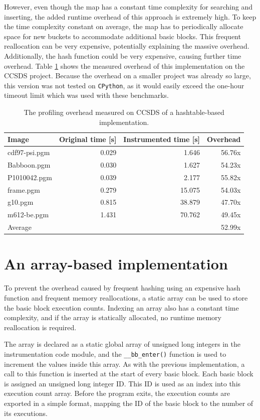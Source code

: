 However, even though the map has a constant time complexity for searching and inserting, the added runtime overhead of this approach is extremely high. To keep the time complexity constant on average, the map has to periodically allocate space for new buckets to accommodate additional basic blocks. This frequent reallocation can be very expensive, potentially explaining the massive overhead. Additionally, the hash function could be very expensive, causing further time overhead. Table \ref{tab:hashtable-ccsds} shows the measured overhead of this implementation on the CCSDS project. Because the overhead on a smaller project was already so large, this version was not tested on \texttt{CPython}, as it would easily exceed the one-hour timeout limit which was used with these benchmarks.


\begin{table}[]
    \centering
    \begin{tabular}{lrrr}
    \textbf{Image} & \textbf{Original time [s]} & \textbf{Instrumented time [s]} & \textbf{Overhead}  \\ 
    \hline
    \hline
    cdf97-psi.pgm & 0.029 & 1.646 & 56.76x \\
    Babboon.pgm & 0.030 & 1.627 & 54.23x \\
    P1010042.pgm & 0.039 & 2.177 & 55.82x \\
    frame.pgm & 0.279 & 15.075 & 54.03x \\
    g10.pgm & 0.815 & 38.879 & 47.70x \\
    m612-be.pgm & 1.431 & 70.762 & 49.45x \\ \hline
    Average & & & 52.99x
    \end{tabular}
    \caption{The profiling overhead measured on CCSDS of a hashtable-based implementation.}
    \label{tab:hashtable-ccsds}
\end{table}



\section{An array-based implementation}
\label{onearray}
To prevent the overhead caused by frequent hashing using an expensive hash function and frequent memory reallocations, a static array can be used to store the basic block execution counts. Indexing an array also has a constant time complexity, and if the array is statically allocated, no runtime memory reallocation is required.

 The array is declared as a static global array of unsigned long integers in the instrumentation code module, and the \texttt{\_\_bb\_enter()} function is used to increment the values inside this array. As with the previous implementation, a call to this function is inserted at the start of every basic block. Each basic block is assigned an unsigned long integer ID. This ID is used as an index into this execution count array. Before the program exits, the execution counts are exported in a simple format, mapping the ID of the basic block to the number of its executions.

